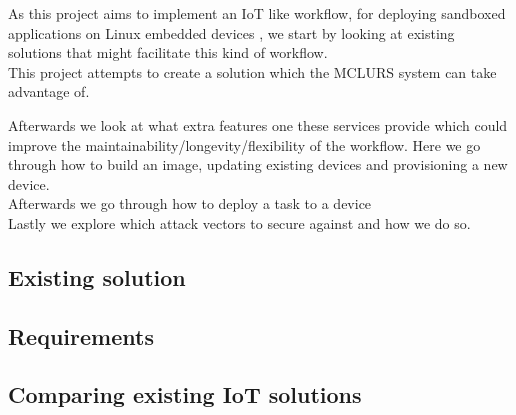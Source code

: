 \documentclass[../../main.tex]{subfiles}
\begin{document}
As this project aims to implement an IoT like workflow, for deploying sandboxed applications
on Linux embedded devices , we start by looking at existing solutions that might
facilitate this kind of workflow.\\

This project attempts to create a solution which the MCLURS system can take advantage of.

Afterwards we look at what extra features one these services provide which could improve
the maintainability/longevity/flexibility of the workflow.
Here we go through how to build an image, updating existing devices and provisioning a new
device.\\

Afterwards we go through how to deploy a task to a device\\

Lastly we explore which attack vectors to secure against and how we do so.

\subsection{Existing solution}%
\label{sub:existing_solution}


\subsection{Requirements}%
\label{sub:requirements}


\subsection{Comparing existing IoT solutions}%
\label{sub:comparing_existing_iot_solutions}

	
\end{document}
